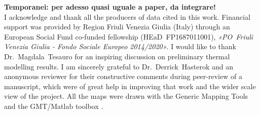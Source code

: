\textbf{Temporanei: per adesso quasi uguale a paper, da integrare!}\\
I acknowledge and thank all the producers of data cited in this work.
Financial support was provided by Region Friuli Venezia Giulia (Italy) through an European Social Fund co-funded fellowship ({HEaD}~{FP1687011001}), \textit{«{PO}~Friuli Venezia Giulia - Fondo Sociale Europeo 2014/2020»}.
I would like to thank Dr.~Magdala~Tesauro for an inspiring discussion on preliminary thermal modelling results.
I am sincerely grateful to Dr.~Derrick~Hasterok and an anonymous reviewer for their constructive comments during peer-review of a manuscript, which were of great help in improving that work and the wider scale view of the project.
All the maps were drawn with the Generic Mapping Tools \parencite[GMT,][]{GMT2013} and the {GMT/Matlab} toolbox \parencite{GMTmex2017}.



